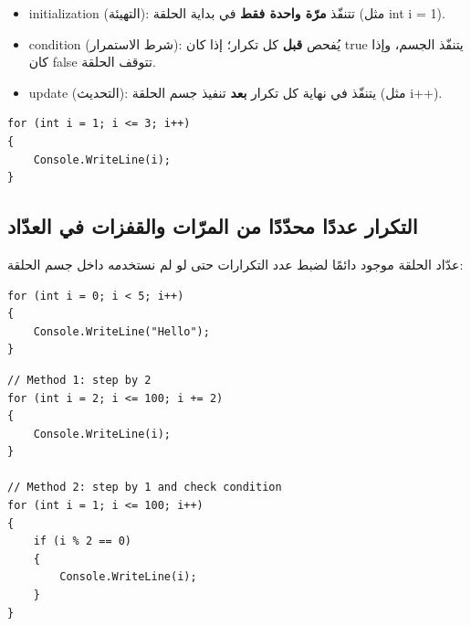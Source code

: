 \documentclass[14pt]{extarticle}
\begin{document}
\begin{itemize}[nosep]
    \item \textenglish{initialization} (التهيئة): تتنفّذ \textbf{مرّة واحدة فقط} في بداية الحلقة (مثل \textenglish{int i = 1}).
    \item \textenglish{condition} (شرط الاستمرار): يُفحص \textbf{قبل} كل تكرار؛ إذا كان \textenglish{true} يتنفّذ الجسم، وإذا كان \textenglish{false} تتوقف الحلقة.
    \item \textenglish{update} (التحديث): يتنفّذ في نهاية كل تكرار \textbf{بعد} تنفيذ جسم الحلقة (مثل \textenglish{i++}).
\end{itemize}

\filbreak
\begin{boxExample}
\begin{english}
\begin{verbatim}
for (int i = 1; i <= 3; i++)
{
    Console.WriteLine(i);
}
\end{verbatim}
\end{english}
\end{boxExample}

\filbreak
\subsection{التكرار عددًا محدّدًا من المرّات والقفزات في العدّاد}
عدّاد الحلقة موجود دائمًا لضبط عدد التكرارات حتى لو لم نستخدمه داخل جسم الحلقة:

\begin{boxExample}
\begin{english}
\begin{verbatim}
for (int i = 0; i < 5; i++)
{
    Console.WriteLine("Hello");
}
\end{verbatim}
\end{english}
\end{boxExample}

\filbreak
\begin{boxExample}
\begin{english}
\begin{verbatim}
// Method 1: step by 2
for (int i = 2; i <= 100; i += 2)
{
    Console.WriteLine(i);
}

// Method 2: step by 1 and check condition
for (int i = 1; i <= 100; i++)
{
    if (i % 2 == 0)
    {
        Console.WriteLine(i);
    }
}
\end{verbatim}
\end{english}
\end{boxExample}
\end{document}
